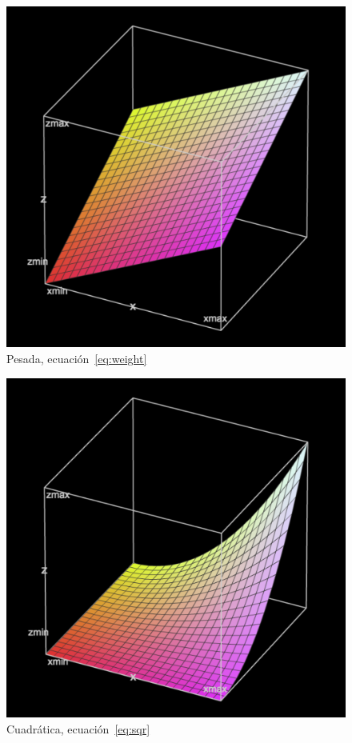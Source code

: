 \documentclass{ci5652}
\begin{document}
\begin{figure}[p]
	\includegraphics[width=\linewidth]{weighted-3b}
	\caption{Pesada, ecuación~\ref{eq:weight}}
	\label{fig:weighted3}
\end{figure}
\begin{figure}[p]
	\includegraphics[width=\linewidth]{squared-3b}
	\caption{Cuadrática, ecuación~\ref{eq:sqr}}
	\label{fig:squared3}
\end{figure}
\end{document}
